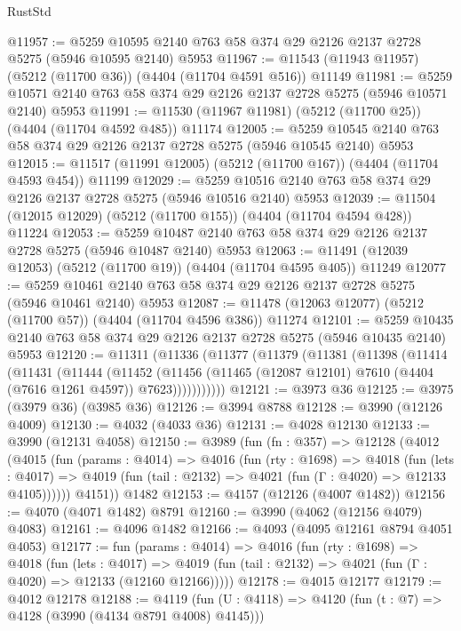 \begin{lexlean}{RustStd}
\begin{coremodule}
@11957 := @5259 @10595 @2140 @763 @58 @374 @29 @2126 @2137 @2728 @5275 (@5946 @10595 @2140) @5953
@11967 := @11543 (@11943 @11957) (@5212 (@11700 @36)) (@4404 (@11704 @4591 @516)) @11149
@11981 := @5259 @10571 @2140 @763 @58 @374 @29 @2126 @2137 @2728 @5275 (@5946 @10571 @2140) @5953
@11991 := @11530 (@11967 @11981) (@5212 (@11700 @25)) (@4404 (@11704 @4592 @485)) @11174
@12005 := @5259 @10545 @2140 @763 @58 @374 @29 @2126 @2137 @2728 @5275 (@5946 @10545 @2140) @5953
@12015 := @11517 (@11991 @12005) (@5212 (@11700 @167)) (@4404 (@11704 @4593 @454)) @11199
@12029 := @5259 @10516 @2140 @763 @58 @374 @29 @2126 @2137 @2728 @5275 (@5946 @10516 @2140) @5953
@12039 := @11504 (@12015 @12029) (@5212 (@11700 @155)) (@4404 (@11704 @4594 @428)) @11224
@12053 := @5259 @10487 @2140 @763 @58 @374 @29 @2126 @2137 @2728 @5275 (@5946 @10487 @2140) @5953
@12063 := @11491 (@12039 @12053) (@5212 (@11700 @19)) (@4404 (@11704 @4595 @405)) @11249
@12077 := @5259 @10461 @2140 @763 @58 @374 @29 @2126 @2137 @2728 @5275 (@5946 @10461 @2140) @5953
@12087 := @11478 (@12063 @12077) (@5212 (@11700 @57)) (@4404 (@11704 @4596 @386)) @11274
@12101 := @5259 @10435 @2140 @763 @58 @374 @29 @2126 @2137 @2728 @5275 (@5946 @10435 @2140) @5953
@12120 := @11311
    (@11336
      (@11377
        (@11379
          (@11381
            (@11398
              (@11414
                (@11431
                  (@11444
                    (@11452
                      (@11456
                        (@11465 (@12087 @12101) @7610 (@4404 (@7616 @1261 @4597)) @7623)))))))))))
@12121 := @3973 @36
@12125 := @3975 (@3979 @36) (@3985 @36)
@12126 := @3994 @8788
@12128 := @3990 (@12126 @4009)
@12130 := @4032 (@4033 @36)
@12131 := @4028 @12130
@12133 := @3990 (@12131 @4058)
@12150 := @3989
    (fun (fn : @357) =>
    @12128
      (@4012
        (@4015
          (fun (params : @4014) =>
          @4016
            (fun (rty : @1698) =>
            @4018
              (fun (lets : @4017) =>
              @4019 (fun (tail : @2132) => @4021 (fun (Γ : @4020) => @12133 @4105))))))
        @4151))
    @1482
@12153 := @4157 (@12126 (@4007 @1482))
@12156 := @4070 (@4071 @1482) @8791
@12160 := @3990 (@4062 (@12156 @4079) @4083)
@12161 := @4096 @1482
@12166 := @4093 (@4095 @12161 @8794 @4051 @4053)
@12177 := fun (params : @4014) =>
  @4016
    (fun (rty : @1698) =>
    @4018
      (fun (lets : @4017) =>
      @4019 (fun (tail : @2132) => @4021 (fun (Γ : @4020) => @12133 (@12160 @12166)))))
@12178 := @4015 @12177
@12179 := @4012 @12178
@12188 := @4119 (fun (U : @4118) => @4120 (fun (t : @7) => @4128 (@3990 (@4134 @8791 @4008) @4145)))

\end{coremodule}
\end{lexlean}
